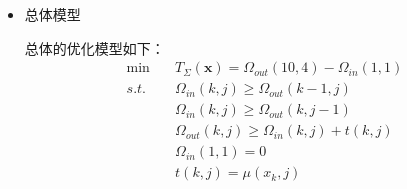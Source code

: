 \documentclass[UTF8]{ctexart}
\begin{document}
\begin{itemize}
	\item 总体模型
	\par 总体的优化模型如下：
	\begin{equation}
		\begin{split}
		\min \quad&T_{\Sigma}(\boldsymbol{x})=\Omega_{out}(10,4)-\Omega_{in}(1,1)\\
		s.t. \quad &\Omega_{in}(k,j)\geqslant\Omega_{out}(k-1,j)\\
		&\Omega_{in}(k,j)\geqslant\Omega_{out}(k,j-1)\\
		&\Omega_{out}(k,j)\geqslant\Omega_{in}(k,j)+t(k,j)\\
		&\Omega_{in}(1,1)=0\\
		&t(k,j)=\mu(x_{k},j)
		\end{split}
	\end{equation}

	\end{itemize}

	
\end{document}
